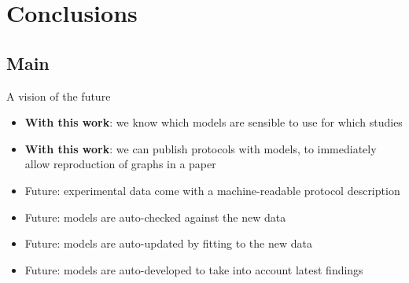 \documentclass[t,xcolor={usenames,dvipsnames}]{beamer}
\begin{document}
\section{Conclusions}
\subsection*{Main}

\begin{frame}{A vision of the future}
\begin{itemize}
\item \textbf{With this work}: we know which models are sensible to use for which studies
\item \textbf{With this work}: we can publish protocols with models, to immediately allow reproduction of graphs in a paper
\item Future: experimental data come with a machine-readable protocol description
\item Future: models are auto-checked against the new data
\item Future: models are auto-updated by fitting to the new data
\item Future: models are auto-developed to take into account latest findings
\end{itemize}
\end{frame}
\end{document}
